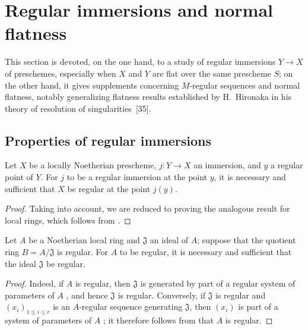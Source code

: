 \section{Regular immersions and normal flatness}
\label{section:IV.19}

This section is devoted, on the one hand, to a study of regular immersions  $Y\to X$ of preschemes, especially when $X$ and $Y$ are flat over the same prescheme $S$; on the other hand, it gives supplements concerning $M$-regular sequences and normal flatness, notably generalizing flatness results established by H.~Hironaka in his theory of resolution of singularities~[35].


\subsection{Properties of regular immersions}
\label{subsection:IV.19.1}


\begin{proposition}[19.1.1]
\label{IV.19.1.1}
Let $X$ be a locally Noetherian prescheme, $j:Y\to X$ an immersion, and $y$ a regular point of $Y$. For $j$ to be a regular immersion at the point $y$, it is necessary and sufficient that $X$ be regular at the point $j(y)$.
\end{proposition}

\begin{proof}
Taking  into account, we are reduced to proving the analogous result for local rings, which follows from .
\end{proof}

\begin{corollary}[19.1.2]
\label{IV.19.1.2}
Let $A$ be a Noetherian local ring and $\mathfrak J$ an ideal of $A$; suppose that the quotient ring $B=A/\mathfrak J$ is regular. For $A$ to be regular, it is necessary and sufficient that the ideal $\mathfrak J$ be regular.
\end{corollary}

\begin{proof}
Indeed, if $A$ is regular, then $\mathfrak J$ is generated by part of a regular system of parameters of $A$ , and hence $\mathfrak J$ is regular. Conversely, if $\mathfrak J$ is regular and $(x_i)_{1\leq i\leq r}$ is an $A$-regular sequence generating $\mathfrak J$, then $(x_i)$ is part of a system of parameters of $A$ ; it therefore follows from  that $A$ is regular.
\end{proof}

